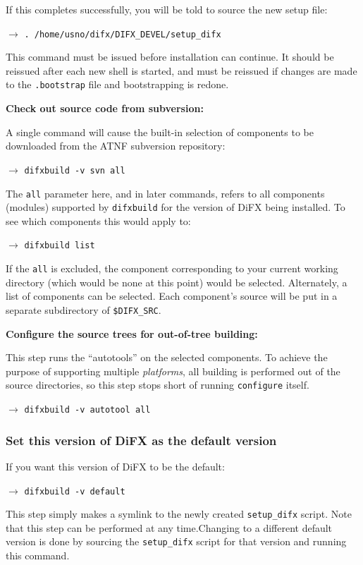 If this completes successfully, you will be told to source the new setup file:

$\longrightarrow$ {\tt . /home/usno/difx/DIFX\_DEVEL/setup\_difx}

This command must be issued before installation can continue.
It should be reissued after each new shell is started, and must be reissued if changes
are made to the {\tt .bootstrap} file and bootstrapping is redone.

\vspace{10pt}
\noindent
{\bf Check out source code from subversion:}

A single command will cause the built-in selection of components to be downloaded from the ATNF subversion repository:

$\longrightarrow$ {\tt difxbuild -v svn all}

The {\tt all} parameter here, and in later commands, refers to all components (modules) supported by {\tt difxbuild} for the version of DiFX being installed.
To see which components this would apply to:

$\longrightarrow$ {\tt difxbuild list}

If the {\tt all} is excluded, the component corresponding to your current working directory (which would be none at this point) would be selected.
Alternately, a list of components can be selected.
Each component's source will be put in a separate subdirectory of {\tt \$DIFX\_SRC}.

\vspace{10pt}
\noindent
{\bf Configure the source trees for out-of-tree building:}

This step runs the ``autotools'' on the selected components.
To achieve the purpose of supporting multiple {\em platforms}, all building is performed out of the source directories, so this step stops short of running {\tt configure} itself.

$\longrightarrow$ {\tt difxbuild -v autotool all}

\subsubsection{Set this version of DiFX as the default version}

If you want this version of DiFX to be the default:

$\longrightarrow$ {\tt difxbuild -v default}

This step simply makes a symlink to the newly created {\tt setup\_difx} script.
Note that this step can be performed at any time.Changing to a different default version is done by sourcing the {\tt setup\_difx} script for that version and running this command.


